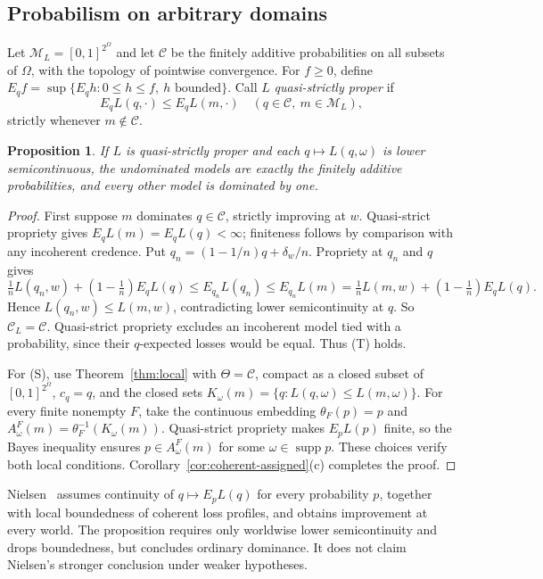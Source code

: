 \documentclass[11pt]{article}
\newtheorem{proposition}[theorem]{Proposition}
\theoremstyle{definition}
\theoremstyle{remark}
\newcommand{\M}{\mathcal M}
\newcommand{\C}{\mathcal C}
\newcommand{\supp}{\operatorname{supp}}
\begin{document}
\subsection{Probabilism on arbitrary domains}
Let $\M_L=[0,1]^{2^\Omega}$ and let $\C$ be the finitely additive probabilities on all subsets of $\Omega$, with the topology of pointwise convergence. For $f\ge0$, define $E_qf=\sup\{E_qh:0\le h\le f,\ h\text{ bounded}\}$. Call $L$ \emph{quasi-strictly proper} if
\[
E_qL(q,\cdot)\le E_qL(m,\cdot)\quad(q\in\C,\ m\in\M_L),
\]
strictly whenever $m\notin\C$.
\begin{proposition}\label{prop:short-infinite}
If $L$ is quasi-strictly proper and each $q\mapsto L(q,\omega)$ is lower semicontinuous, the undominated models are exactly the finitely additive probabilities, and every other model is dominated by one.
\end{proposition}
\begin{proof}
First suppose $m$ dominates $q\in\C$, strictly improving at $w$. Quasi-strict propriety gives $E_qL(m)=E_qL(q)<\infty$; finiteness follows by comparison with any incoherent credence. Put $q_n=(1-1/n)q+\delta_w/n$. Propriety at $q_n$ and $q$ gives
\[
\tfrac1nL(q_n,w)+(1-\tfrac1n)E_qL(q)
\le E_{q_n}L(q_n)\le E_{q_n}L(m)
=\tfrac1nL(m,w)+(1-\tfrac1n)E_qL(q).
\]
Hence $L(q_n,w)\le L(m,w)$, contradicting lower semicontinuity at $q$. So $\C_L=\C$. Quasi-strict propriety excludes an incoherent model tied with a probability, since their $q$-expected losses would be equal. Thus (T) holds.

For (S), use Theorem~\ref{thm:local} with $\Theta=\C$, compact as a closed subset of $[0,1]^{2^\Omega}$, $c_q=q$, and the closed sets $K_\omega(m)=\{q:L(q,\omega)\le L(m,\omega)\}$. For every finite nonempty $F$, take the continuous embedding $\theta_F(p)=p$ and $A^F_\omega(m)=\theta_F^{-1}(K_\omega(m))$. Quasi-strict propriety makes $E_pL(p)$ finite, so the Bayes inequality ensures $p\in A^F_\omega(m)$ for some $\omega\in\supp p$. These choices verify both local conditions. Corollary~\ref{cor:coherent-assigned}(c) completes the proof.
\end{proof}
Nielsen~\cite{Nielsen2023} assumes continuity of $q\mapsto E_pL(q)$ for every probability $p$, together with local boundedness of coherent loss profiles, and obtains improvement at every world. The proposition requires only worldwise lower semicontinuity and drops boundedness, but concludes ordinary dominance. It does not claim Nielsen's stronger conclusion under weaker hypotheses.
\end{document}

